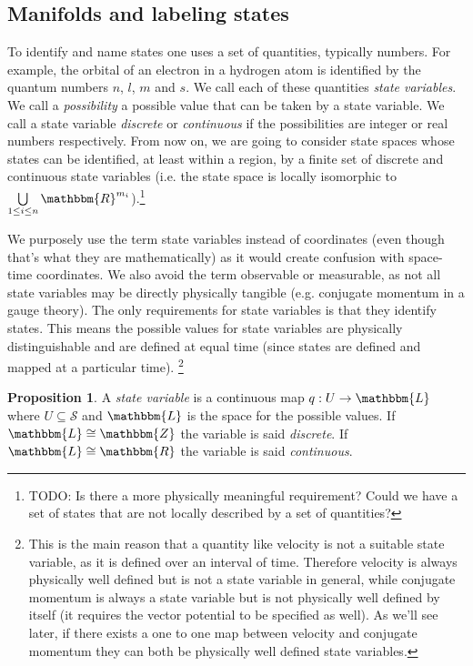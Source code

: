 \documentclass[aps,pra,10pt,twocolumn,floatfix,nofootinbib]{revtex4-1}
\numberwithin{equation}{section}
\theoremstyle{definition}
\newtheorem{prop}[equation]{Proposition}
\begin{document}
\subsection{Manifolds and labeling states}

To identify and name states one uses a set of quantities, typically numbers. For example, the orbital of an electron in a hydrogen atom is identified by the quantum numbers $n$, $l$, $m$ and $s$. We call each of these quantities \emph{state variables}. We call a \emph{possibility} a possible value that can be taken by a state variable. We call a state variable \emph{discrete} or \emph{continuous} if the possibilities are integer or real numbers respectively. From now on, we are going to consider state spaces whose states can be identified, at least within a region, by a finite set of discrete and continuous state variables (i.e. the state space is locally isomorphic to $\bigcup\limits_{1 \leq i \leq n} \mathbbm{R}^{m_i}$).\footnote{TODO: Is there a more physically meaningful requirement? Could we have a set of states that are not locally described by a set of quantities?}

We purposely use the term state variables instead of coordinates (even though that's what they are mathematically) as it would create confusion with space-time coordinates. We also avoid the term observable or measurable, as not all state variables may be directly physically tangible (e.g. conjugate momentum in a gauge theory). The only requirements for state variables is that they identify states. This means the possible values for state variables are physically distinguishable and are defined at equal time (since states are defined and mapped at a particular time). \footnote{This is the main reason that a quantity like velocity is not a suitable state variable, as it is  defined over an interval of time. Therefore velocity is always physically well defined but is not a state variable in general, while conjugate momentum is always a state variable but is not physically well defined by itself (it requires the vector potential to be specified as well). As we'll see later, if there exists a one to one map between velocity and conjugate momentum they can both be physically well defined state variables.}

\begin{prop}\label{state_variable}
	A \emph{state variable} is a continuous map $q : U \rightarrow \mathbbm{L}$ where $U \subseteq \mathcal{S}$ and $\mathbbm{L}$ is the space for the possible values. If $\mathbbm{L}\cong \mathbbm{Z}$ the variable is said \emph{discrete}. If $\mathbbm{L}\cong \mathbbm{R}$ the variable is said \emph{continuous}.
\end{prop}
\end{document}
